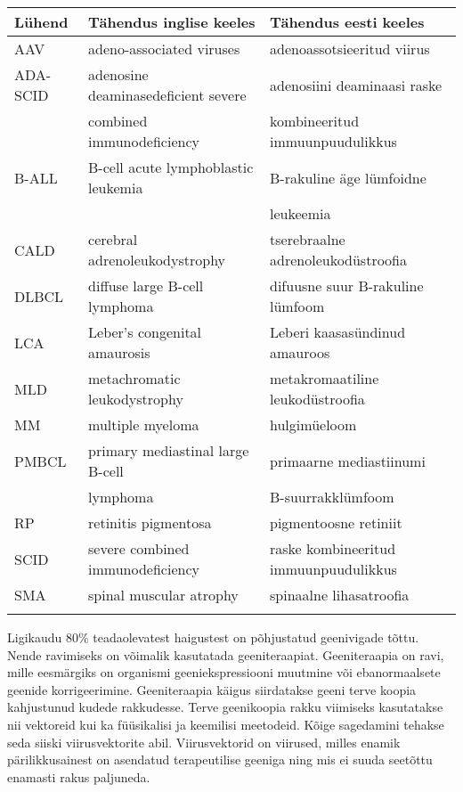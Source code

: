 \documentclass{trkut}%
\begin{document}
\maketitle%
\tableofcontents%


\setlength\tabcolsep{0 pt}

\begin{center}
	\begin{tabular}{p{2.5cm} p{7.3cm} p{6cm}}
		Lühend & Tähendus inglise keeles & Tähendus eesti keeles \\ \hline
		AAV & adeno-associated viruses & adenoassotsieeritud viirus \\
		ADA-SCID & adenosine deaminasedeficient severe & adenosiini deaminaasi raske \\
		& combined immunodeficiency  & kombineeritud immuunpuudulikkus \\
		B-ALL & B-cell acute lymphoblastic leukemia & B-rakuline äge lümfoidne \\
		&  & leukeemia \\
		CALD & cerebral adrenoleukodystrophy & tserebraalne adrenoleukodüstroofia \\		
		DLBCL & diffuse large B-cell lymphoma & difuusne suur B-rakuline lümfoom \\
		LCA & Leber’s congenital amaurosis & Leberi kaasasündinud amauroos \\
		MLD &  metachromatic leukodystrophy & 
		metakromaatiline leukodüstroofia \\
		MM & multiple myeloma & hulgimüeloom \\		
		PMBCL & primary mediastinal large B-cell &  primaarne mediastiinumi \\
		& lymphoma & B-suurrakklümfoom \\
		RP & retinitis pigmentosa  & pigmentoosne retiniit \\
		SCID & severe combined immunodeficiency & raske kombineeritud immuunpuudulikkus\\
		SMA & spinal muscular atrophy & spinaalne lihasatroofia \\
		&  &  \\

	\end{tabular}
\end{center}

\setlength\tabcolsep{6 pt}



Ligikaudu 80\% teadaolevatest haigustest on põhjustatud geenivigade tõttu. Nende ravimiseks on võimalik kasutatada geeniteraapiat. Geeniteraapia on ravi, mille eesmärgiks on organismi geeniekspressiooni muutmine või ebanormaalsete geenide korrigeerimine. Geeniteraapia käigus siirdatakse geeni terve koopia kahjustunud kudede rakkudesse. Terve geenikoopia rakku viimiseks kasutatakse nii vektoreid kui ka füüsikalisi ja keemilisi meetodeid. Kõige sagedamini tehakse seda siiski viirusvektorite abil. Viirusvektorid on viirused, milles enamik pärilikkusainest on asendatud terapeutilise geeniga ning mis ei suuda seetõttu enamasti rakus paljuneda. 
\end{document}
